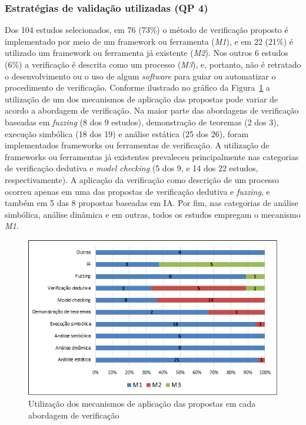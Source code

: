 

\subsubsection*{\textbf{Estratégias de validação utilizadas (\textbf{QP 4})}}

Dos 104 estudos selecionados, em 76 (73\%) o método de verificação proposto é implementado por meio de um framework ou ferramenta (\textit{M1}), e em 22 (21\%) é utilizado um framework ou ferramenta já existente (\textit{M2}). Nos outros 6 estudos (6\%) a verificação é descrita como um processo (\textit{M3}), e, portanto, não é retratado o desenvolvimento ou o uso de algum \textit{software} para guiar ou automatizar o procedimento de verificação. Conforme ilustrado no gráfico da Figura~\ref{fig:rq4-aplicacao-propostas} a utilização de um dos mecanismos de aplicação das propostas pode variar de acordo a abordagem de verificação. Na maior parte das abordagens de verificação baseadas em \textit{fuzzing} (8 dos 9 estudos), demonstração de teoremas (2 dos 3), execução simbólica (18 dos 19) e análise estática (25 dos 26), foram implementados frameworks ou ferramentas de verificação. A utilização de frameworks ou ferramentas já existentes prevaleceu principalmente nas categorias de verificação dedutiva e \textit{model checking} (5 dos 9, e 14 dos 22 estudos, respectivamente). A aplicação da verificação como descrição de um processo ocorreu apenas em uma das propostas de verificação dedutiva e \textit{fuzzing}, e também em 5 das 8 propostas baseadas em IA. Por fim, nas categorias de análise simbólica, análise dinâmica e em outras, todos os estudos empregam o mecanismo \textit{M1}.   

\begin{figure}[!htb]
 \caption{Utilização dos mecanismos de aplicação das propostas em cada abordagem de verificação}
 \label{fig:rq4-aplicacao-propostas}
 \centering
 \includegraphics[scale=0.7]{figuras/rq4-aplicacao-propostas.png}
 \fdadospesquisa
\end{figure}


